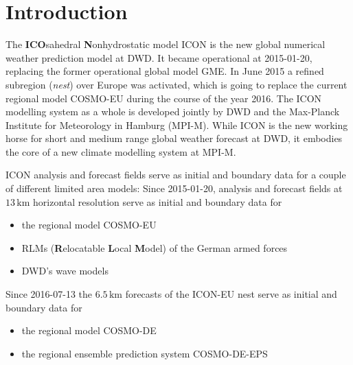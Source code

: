\chapter{Introduction}

The \textbf{ICO}sahedral \textbf{N}onhydrostatic model ICON is the new global numerical 
weather prediction model at DWD. It became operational at 2015-01-20, replacing the former  
operational global model GME. 
In June 2015 a refined subregion (\emph{nest}) over Europe was activated, which is going to 
replace the current regional model COSMO-EU during the course of the year 2016.
The ICON modelling system as a whole is developed jointly by DWD and the Max-Planck Institute 
for Meteorology in Hamburg (MPI-M). While ICON is the new working horse for short and medium range 
global weather forecast at DWD, it embodies the core of a new climate modelling system at MPI-M.

ICON analysis and forecast fields serve as initial and boundary data for a couple of different 
limited area models:
Since 2015-01-20, analysis and forecast fields at $13\,\mathrm{km}$ horizontal resolution 
serve as initial and boundary data for
\begin{itemize}
 \item the regional model COSMO-EU
 \item RLMs (\textbf{R}elocatable \textbf{L}ocal \textbf{M}odel) of the German armed forces
 \item DWD's wave models
\end{itemize}
Since 2016-07-13 the $6.5\,\mathrm{km}$ forecasts of the ICON-EU nest serve as initial and 
boundary data for
\begin{itemize}
 \item the regional model COSMO-DE
 \item the regional ensemble prediction system COSMO-DE-EPS
\end{itemize}


